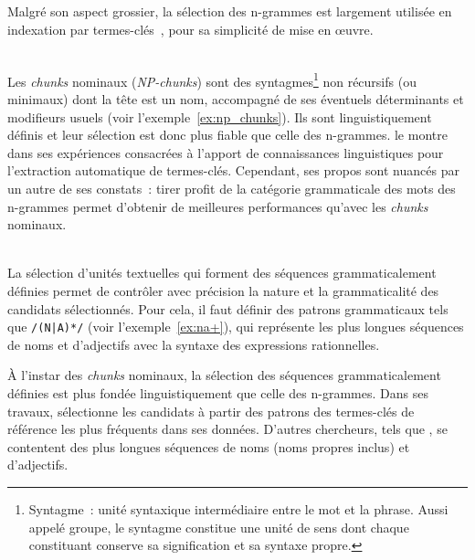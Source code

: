     Malgré son aspect grossier, la sélection des n-grammes est largement
    utilisée en indexation par
    termes-clés~\cite{witten1999kea,hulth2003keywordextraction,medelyan2009humancompetitivetagging},
    pour sa simplicité de mise en \oe{}uvre.

    \begin{example}\label{ex:n_grams}
    \end{example}

    ~\\Les \textit{chunks} nominaux
    (\textit{NP-chunks}) sont des syntagmes\footnote{Syntagme~: unité syntaxique
    intermédiaire entre le mot et la phrase. Aussi appelé groupe, le syntagme
    constitue une unité de sens dont chaque constituant conserve sa
    signification et sa syntaxe propre.} non récursifs (ou minimaux) dont la
    tête est un nom, accompagné de ses éventuels déterminants et modifieurs
    usuels (voir l'exemple~\ref{ex:np_chunks}). Ils sont linguistiquement
    définis et leur sélection est donc plus fiable que celle des n-grammes.
     le montre dans ses expériences
    consacrées à l'apport de connaissances linguistiques pour l'extraction
    automatique de termes-clés. Cependant, ses propos sont nuancés par un autre
    de ses constats~: tirer profit de la catégorie grammaticale des mots des
    n-grammes permet d'obtenir de meilleures performances qu'avec les
    \textit{chunks} nominaux.

    \begin{example}\label{ex:np_chunks}
    \end{example}

    ~\\La sélection d'unités textuelles qui forment des séquences
    grammaticalement définies permet de contrôler
    avec précision la nature et la grammaticalité des candidats sélectionnés.
    Pour cela, il faut définir des patrons grammaticaux tels que
    \texttt{/(N|A)*/} (voir l'exemple~\ref{ex:na+}), qui représente les plus
    longues séquences de noms et d'adjectifs avec la syntaxe des expressions
    rationnelles.

    À l'instar des \textit{chunks} nominaux, la sélection des séquences
    grammaticalement définies est plus fondée linguistiquement que celle des
    n-grammes. Dans ses travaux, 
    sélectionne les candidats à partir des patrons des termes-clés de référence
    les plus fréquents dans ses données. D'autres chercheurs,
    tels que , se contentent des plus longues
    séquences de noms (noms propres inclus) et d'adjectifs.

